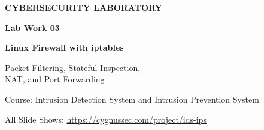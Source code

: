 \begin{frame}[plain]
  \vfill
  {\color{ResearchColor}\fontsize{15}{18}\selectfont\bfseries CYBERSECURITY LABORATORY\par}
  \vspace{0.15cm}
  {\color{SecondaryColor}\fontsize{17}{20}\selectfont\bfseries Lab Work 03\par}
  \vspace{0.22cm}
  {\color{TitleColor}\fontsize{25}{30}\selectfont\bfseries
    Linux Firewall with iptables\par}
  \vspace{0.25cm}
  {\color{ResearchColor}\fontsize{17}{21}\selectfont
    Packet Filtering, Stateful Inspection,\\
    NAT, and Port Forwarding\par}
  \vspace{0.20cm}
  {\color{SecondaryColor}\fontsize{13}{16}\selectfont
    Course: Intrusion Detection System and Intrusion Prevention System\par}
  \vfill
  {\color{SecondaryColor}\fontsize{12}{15}\selectfont All Slide Shows: \url{https://cygnussec.com/project/ids-ips}\par}
\end{frame}
